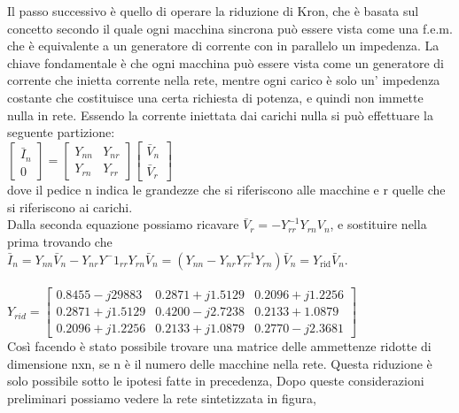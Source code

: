 \documentclass[Lau,noexaminfo]{sapthesis}
\begin{document}
	Il passo successivo è quello di operare la riduzione di Kron, che è basata sul concetto secondo il quale ogni macchina sincrona può essere vista come una f.e.m. che è equivalente a un generatore di corrente con in parallelo un impedenza. La chiave fondamentale è che ogni macchina può essere vista come un generatore di corrente che inietta corrente nella rete, mentre ogni carico è solo un' impedenza costante che costituisce una certa richiesta di potenza, e quindi non immette nulla in rete. Essendo la corrente iniettata dai carichi nulla si può effettuare la seguente partizione:\\
	$\begin{bmatrix}
	\bar{I}_n\\
	0
	\end{bmatrix}=
	\begin{bmatrix}
	Y_{nn} & Y_{nr}\\
	Y_{rn} & Y_{rr}
	\end{bmatrix}
	\begin{bmatrix}
	\bar{V}_n\\
	\bar{V}_r
	\end{bmatrix}$\\
	dove il pedice n indica le grandezze che si riferiscono alle macchine e r quelle che si riferiscono ai carichi.\\
	Dalla seconda equazione possiamo ricavare $\bar{V}_r=-Y^{-1}_{rr}Y_{rn}V_n$, e sostituire nella prima trovando che\\
	$\bar{I}_n=Y_{nn}\bar{V}_n-Y_{nr}Y^-1_{rr}Y_{rn}\bar{V}_n=(Y_{nn}-Y_{nr}Y^{-1}_{rr}Y_{rn})\bar{V}_n=Y_{\text{rid}}\bar{V}_n$.\\\\
	$Y_{rid}=
	\begin{bmatrix}
	0.8455-j29883 & 0.2871+j1.5129 & 0.2096+j1.2256\\
	0.2871+j1.5129 & 0.4200-j2.7238 & 0.2133+1.0879\\
	0.2096+j1.2256 & 0.2133+j1.0879 & 0.2770-j2.3681
	\end{bmatrix}$\\
	Così facendo è stato possibile trovare una matrice delle ammettenze ridotte di dimensione nxn, se n è il numero delle macchine nella rete. Questa riduzione è solo possibile sotto le ipotesi fatte in precedenza, 
	Dopo queste considerazioni preliminari possiamo vedere la rete sintetizzata in figura,\\
\end{document}
